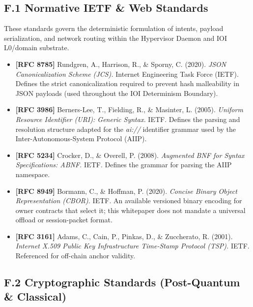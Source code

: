 \documentclass[
  11pt,
]{article}
\providecommand{\tightlist}{%
  \setlength{\itemsep}{0pt}\setlength{\parskip}{0pt}}
\begin{document}
\hypertarget{f.1-normative-ietf-web-standards}{%
\subsection{F.1 Normative IETF \& Web
Standards}\label{f.1-normative-ietf-web-standards}}

These standards govern the deterministic formulation of intents, payload
serialization, and network routing within the Hypervisor Daemon and IOI
L0/domain substrate.

\begin{itemize}
\tightlist
\item
  \textbf{{[}RFC 8785{]}} Rundgren, A., Harrison, R., \& Sporny, C.
  (2020). \emph{JSON Canonicalization Scheme (JCS).} Internet
  Engineering Task Force (IETF). Defines the strict canonicalization
  required to prevent hash malleability in JSON payloads (used
  throughout the IOI Determinism Boundary).
\item
  \textbf{{[}RFC 3986{]}} Berners-Lee, T., Fielding, R., \& Masinter, L.
  (2005). \emph{Uniform Resource Identifier (URI): Generic Syntax.}
  IETF. Defines the parsing and resolution structure adapted for the
  \emph{ai://} identifier grammar used by the Inter-Autonomous-System
  Protocol (AIIP).
\item
  \textbf{{[}RFC 5234{]}} Crocker, D., \& Overell, P. (2008).
  \emph{Augmented BNF for Syntax Specifications: ABNF.} IETF. Defines
  the grammar for parsing the AIIP namespace.
\item
  \textbf{{[}RFC 8949{]}} Bormann, C., \& Hoffman, P. (2020).
  \emph{Concise Binary Object Representation (CBOR).} IETF. An available
  versioned binary encoding for owner contracts that select it; this
  whitepaper does not mandate a universal offload or session-packet format.
\item
  \textbf{{[}RFC 3161{]}} Adams, C., Cain, P., Pinkas, D., \&
  Zuccherato, R. (2001). \emph{Internet X.509 Public Key Infrastructure
  Time-Stamp Protocol (TSP).} IETF. Referenced for off-chain anchor
  validity.
\end{itemize}

\hypertarget{f.2-cryptographic-standards-post-quantum-classical}{%
\subsection{F.2 Cryptographic Standards (Post-Quantum \&
Classical)}\label{f.2-cryptographic-standards-post-quantum-classical}}
\end{document}

